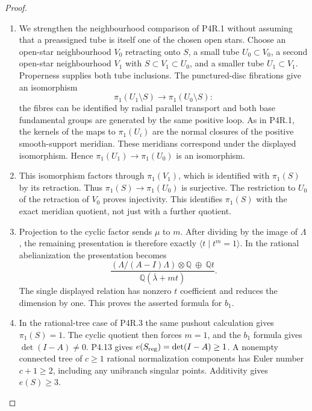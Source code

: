 \begin{proof}

\begin{enumerate}[label={$\langle1\rangle$\arabic*.},leftmargin=*]
\item We strengthen the neighbourhood comparison of P4R.1
without assuming that a preassigned tube is itself
one of the chosen open stars. Choose an open-star
neighbourhood $V_0$ retracting onto $S$, a small tube
$U_0\subset V_0$, a second open-star neighbourhood
$V_1$ with $S\subset V_1\subset U_0$, and a smaller
tube $U_1\subset V_1$. Properness supplies both tube
inclusions. The punctured-disc fibrations give an
isomorphism
\[
 \pi_1(U_1\setminus S)\longrightarrow
 \pi_1(U_0\setminus S):
\]
the fibres can be identified by radial parallel
transport and both base fundamental groups are
generated by the same positive loop. As in P4R.1,
the kernels of the maps to $\pi_1(U_i)$ are the
normal closures of the positive smooth-support
meridian. These meridians correspond under the
displayed isomorphism. Hence
$\pi_1(U_1)\to\pi_1(U_0)$ is an isomorphism.

\item This isomorphism factors through $\pi_1(V_1)$,
which is identified with $\pi_1(S)$ by its
retraction. Thus $\pi_1(S)\to\pi_1(U_0)$ is
surjective. The restriction to $U_0$ of the
retraction of $V_0$ proves injectivity. This
identifies $\pi_1(S)$ with the exact meridian
quotient, not just with a further quotient.

\item Projection to the cyclic factor sends $\mu$ to
$m$. After dividing by the image of $\Lambda$,
the remaining presentation is therefore exactly
$\langle t\mid t^m=1\rangle$. In the rational
abelianization the presentation becomes
\[
 \frac{(\Lambda/(A-I)\Lambda)\otimes\mathbb Q
       \ \oplus\ \mathbb Qt}
      {\mathbb Q(\overline\lambda+mt)}.
\]
The single displayed relation has nonzero
$t$ coefficient and reduces the dimension by
one. This proves the asserted formula for $b_1$.

\item In the rational-tree case of P4R.3 the same
pushout calculation gives $\pi_1(S)=1$.
The cyclic quotient then forces $m=1$, and the
$b_1$ formula gives $\det(I-A)\ne0$.
P4.13 gives
$e(S_{\rm reg})=\det(I-A)\ge1$.
A nonempty connected tree of $c\ge1$ rational
normalization components has Euler number
$c+1\ge2$, including any unibranch singular
points. Additivity gives $e(S)\ge3$.

\end{enumerate}
\end{proof}